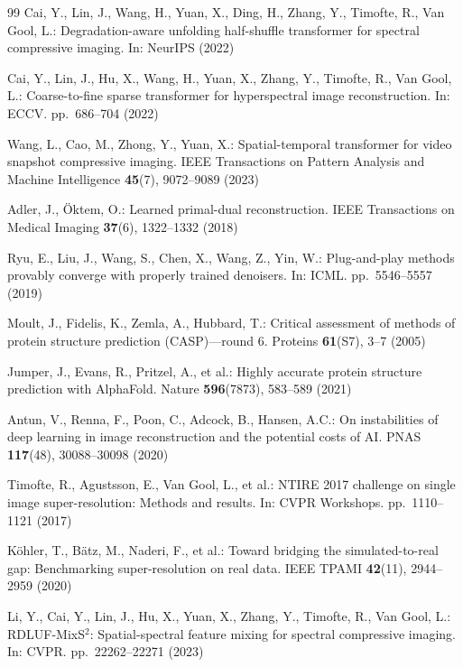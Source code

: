 \documentclass[runningheads]{llncs}
\begin{document}
\begin{thebibliography}{99}
Cai, Y., Lin, J., Wang, H., Yuan, X., Ding, H., Zhang, Y., Timofte, R., Van Gool, L.:
Degradation-aware unfolding half-shuffle transformer for spectral compressive imaging.
In: NeurIPS (2022)

Cai, Y., Lin, J., Hu, X., Wang, H., Yuan, X., Zhang, Y., Timofte, R., Van Gool, L.:
Coarse-to-fine sparse transformer for hyperspectral image reconstruction.
In: ECCV. pp.~686--704 (2022)

Wang, L., Cao, M., Zhong, Y., Yuan, X.:
Spatial-temporal transformer for video snapshot compressive imaging.
IEEE Transactions on Pattern Analysis and Machine Intelligence \textbf{45}(7), 9072--9089 (2023)

Adler, J., {\"O}ktem, O.:
Learned primal-dual reconstruction.
IEEE Transactions on Medical Imaging \textbf{37}(6), 1322--1332 (2018)

Ryu, E., Liu, J., Wang, S., Chen, X., Wang, Z., Yin, W.:
Plug-and-play methods provably converge with properly trained denoisers.
In: ICML. pp.~5546--5557 (2019)

Moult, J., Fidelis, K., Zemla, A., Hubbard, T.:
Critical assessment of methods of protein structure prediction (CASP)---round 6.
Proteins \textbf{61}(S7), 3--7 (2005)

Jumper, J., Evans, R., Pritzel, A., et al.:
Highly accurate protein structure prediction with AlphaFold.
Nature \textbf{596}(7873), 583--589 (2021)

Antun, V., Renna, F., Poon, C., Adcock, B., Hansen, A.C.:
On instabilities of deep learning in image reconstruction and the potential costs of AI.
PNAS \textbf{117}(48), 30088--30098 (2020)

Timofte, R., Agustsson, E., Van Gool, L., et al.:
NTIRE 2017 challenge on single image super-resolution: Methods and results.
In: CVPR Workshops. pp.~1110--1121 (2017)

K{\"o}hler, T., B{\"a}tz, M., Naderi, F., et al.:
Toward bridging the simulated-to-real gap: Benchmarking super-resolution on real data.
IEEE TPAMI \textbf{42}(11), 2944--2959 (2020)

Li, Y., Cai, Y., Lin, J., Hu, X., Yuan, X., Zhang, Y., Timofte, R., Van Gool, L.:
RDLUF-MixS$^2$: Spatial-spectral feature mixing for spectral compressive imaging.
In: CVPR. pp.~22262--22271 (2023)


\end{thebibliography}
\end{document}
